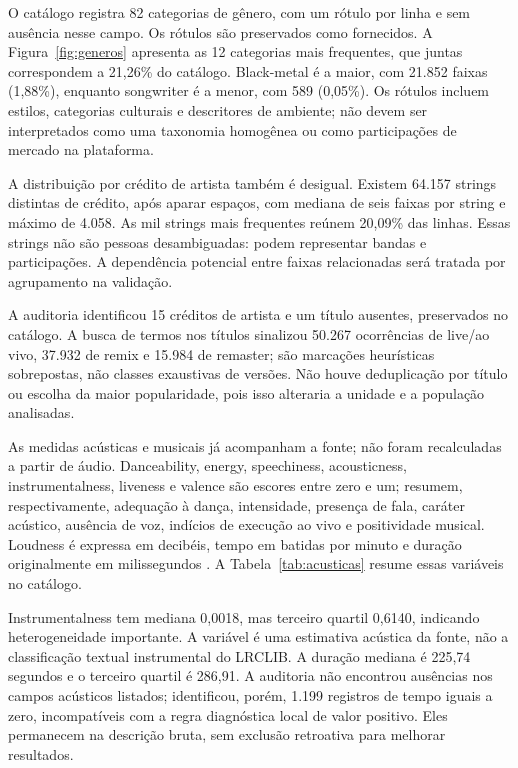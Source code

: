 O catálogo registra 82 categorias de gênero, com um rótulo por linha e sem ausência nesse campo. Os rótulos são preservados como fornecidos. A Figura~\ref{fig:generos} apresenta as 12 categorias mais frequentes, que juntas correspondem a 21,26\% do catálogo. Black-metal é a maior, com 21.852 faixas (1,88\%), enquanto songwriter é a menor, com 589 (0,05\%). Os rótulos incluem estilos, categorias culturais e descritores de ambiente; não devem ser interpretados como uma taxonomia homogênea ou como participações de mercado na plataforma.


A distribuição por crédito de artista também é desigual. Existem 64.157 strings distintas de crédito, após aparar espaços, com mediana de seis faixas por string e máximo de 4.058. As mil strings mais frequentes reúnem 20,09\% das linhas. Essas strings não são pessoas desambiguadas: podem representar bandas e participações. A dependência potencial entre faixas relacionadas será tratada por agrupamento na validação.

A auditoria identificou 15 créditos de artista e um título ausentes, preservados no catálogo. A busca de termos nos títulos sinalizou 50.267 ocorrências de live/ao vivo, 37.932 de remix e 15.984 de remaster; são marcações heurísticas sobrepostas, não classes exaustivas de versões. Não houve deduplicação por título ou escolha da maior popularidade, pois isso alteraria a unidade e a população analisadas.

As medidas acústicas e musicais já acompanham a fonte; não foram recalculadas a partir de áudio. Danceability, energy, speechiness, acousticness, instrumentalness, liveness e valence são escores entre zero e um; resumem, respectivamente, adequação à dança, intensidade, presença de fala, caráter acústico, ausência de voz, indícios de execução ao vivo e positividade musical. Loudness é expressa em decibéis, tempo em batidas por minuto e duração originalmente em milissegundos \cite{spotifyaudio}. A Tabela~\ref{tab:acusticas} resume essas variáveis no catálogo.



Instrumentalness tem mediana 0,0018, mas terceiro quartil 0,6140, indicando heterogeneidade importante. A variável é uma estimativa acústica da fonte, não a classificação textual instrumental do LRCLIB. A duração mediana é 225,74 segundos e o terceiro quartil é 286,91. A auditoria não encontrou ausências nos campos acústicos listados; identificou, porém, 1.199 registros de tempo iguais a zero, incompatíveis com a regra diagnóstica local de valor positivo. Eles permanecem na descrição bruta, sem exclusão retroativa para melhorar resultados.

